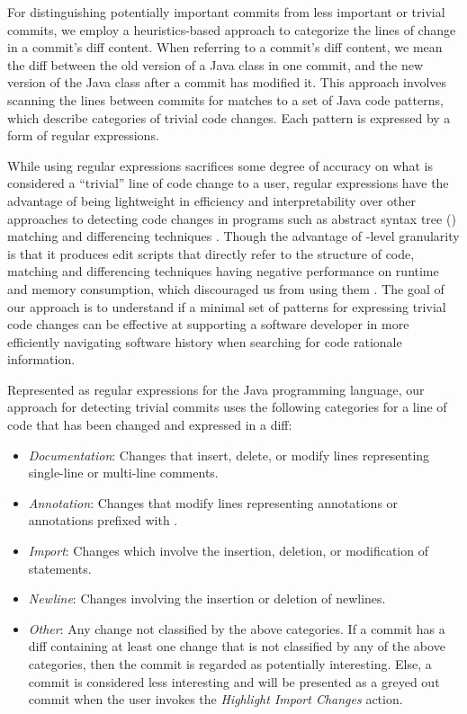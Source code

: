 For distinguishing potentially important commits from less important or trivial commits, we employ a heuristics-based approach to categorize the lines of change in a commit's diff content.
When referring to a commit's diff content, we mean the diff between the old version of a Java class in one commit, and the new version of the Java class after a commit has modified it.
This approach involves scanning the lines between commits for matches to a set of Java code patterns, which describe categories of trivial code changes.
Each pattern is expressed by a form of regular expressions.

While using regular expressions sacrifices some degree of accuracy on what is considered a ``trivial'' line of code change to a user,
regular expressions have the advantage of being lightweight in efficiency and interpretability over other approaches to detecting code changes in programs such as abstract syntax tree () matching and differencing techniques \cite{murphy_lightweight_1996}.
Though the advantage of -level granularity is that it produces edit scripts that directly refer to the structure of code,  matching and differencing techniques having negative performance on runtime and memory consumption, which discouraged us from using them \cite{fluri_change_2007,pawlik_RTED_2011,falleri_fine-grained_2014}.
The goal of our approach is to understand if a minimal set of patterns for expressing trivial code changes can be effective at supporting a software developer in more efficiently navigating software history when searching for code rationale information.

Represented as regular expressions for the Java programming language, our approach for detecting trivial commits uses the following categories for a line of code that has been changed and expressed in a diff: 

\begin{itemize}
    \item \textit{Documentation}: Changes that insert, delete, or modify lines representing single-line or multi-line comments.
    \item \textit{Annotation}: Changes that modify lines representing  annotations or annotations prefixed with .
    \item \textit{Import}: Changes which involve the insertion, deletion, or modification of  statements.
    \item \textit{Newline}: Changes involving the insertion or deletion of newlines.
    \item \textit{Other}: Any change not classified by the above categories. If a commit has a diff containing at least one change that is not classified by any of the above categories, then the commit is regarded as potentially interesting. Else, a commit is considered less interesting and will be presented as a greyed out commit when the user invokes the \emph{Highlight Import Changes} action.
\end{itemize}

